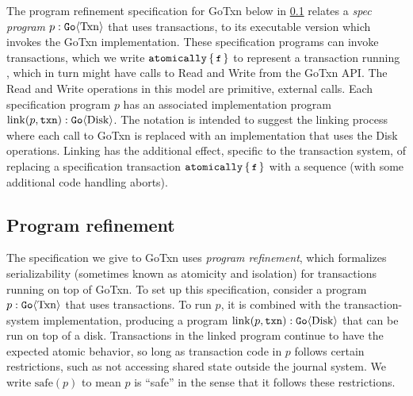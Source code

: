 The program refinement specification for GoTxn below in
\cref{sec:txn:program-refinement} relates a \emph{spec program}
$p : \mathtt{Go}\langle \mathrm{Txn} \rangle$ that uses transactions, to its executable version
which invokes the GoTxn implementation. These specification programs can invoke
transactions, which we write $\atomically{\cc{f}}$ to represent a transaction
running , which in turn might have calls to Read and Write from the GoTxn
API. The Read and Write operations in this model are primitive, external calls.
Each specification program $p$ has an associated implementation program
$\mathrm{link}(p, \texttt{txn}) : \mathtt{Go}\langle \mathrm{Disk} \rangle$. The notation is intended
to suggest the linking process where each call to GoTxn is replaced with an
implementation that uses the Disk operations. Linking has the additional effect,
specific to the transaction system, of replacing a specification transaction
$\atomically{\cc{f}}$ with a sequence 
(with some additional code handling aborts).

\subsection{Program refinement}
\label{sec:txn:program-refinement}

The specification we give to GoTxn uses \emph{program refinement},
which formalizes serializability (sometimes known as atomicity and isolation)
for transactions running on top of GoTxn.
To set up this specification, consider a program $p : \mathtt{Go}\langle \mathrm{Txn} \rangle$ that
uses transactions.
To run $p$, it is combined with the transaction-system implementation, producing
a program $\mathrm{link}(p, \texttt{txn}) : \mathtt{Go}\langle \mathrm{Disk} \rangle$ that can be run on
top of a disk.
Transactions in the linked program continue to have the expected atomic
behavior, so long as transaction code in $p$ follows certain restrictions, such
as not accessing shared state outside the journal system.  We write
$\mathrm{safe}(p)$ to mean $p$ is ``safe'' in the sense that it follows these restrictions.


